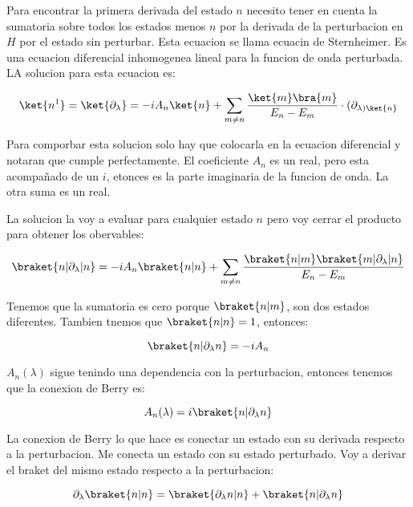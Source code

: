 \documentclass[11pt,fleqn]{book}
\begin{document}
Para encontrar la primera derivada del estado $n$ necesito tener en cuenta la sumatoria sobre todos los estados menos $n$ por la derivada de la perturbacion en $H$ por el estado sin perturbar. Esta ecuacion se llama ecuacin de Sternheimer. Es una ecuacion diferencial inhomogenea lineal para la funcion de onda perturbada. LA solucion para esta ecuacion es:

\begin{equation}
    \ket{n^{1}}=\ket{\partial_\lambda}=-iA_{n}\ket{n}+\sum_{m\neq n}\frac{\ket{m}\bra{m}}{E_{n}-E_{m}}\cdot(\partial_{\lambda)\ket{n}}
\end{equation}

Para comporbar esta solucion solo hay que colocarla en la ecuacion diferencial y notaran que cumple perfectamente. El coeficiente $A_{n}$ es un real, pero esta acompañado de un $i$, etonces es la parte imaginaria de la funcion de onda. La otra suma es un real. 

La solucion la voy a evaluar para cualquier estado $n$ pero voy cerrar el producto para obtener los obervables:

\begin{equation}
    \braket{n|\partial_{\lambda}|n}=-iA_{n}\braket{n|n}+\sum_{m\neq n}\frac{\braket{n|m}\braket{m|\partial_{\lambda}|n}}{E_{n}-E_{m}}
\end{equation}

Tenemos que la sumatoria es cero porque $\braket{n|m}$, son dos estados diferentes. Tambien tnemos que $\braket{n|n}=1$, entonces:

\begin{equation}
     \braket{n|\partial_{\lambda}n}=-iA_{n}
\end{equation}

$A_{n}(\lambda)$ sigue tenindo una dependencia con la perturbacion, entonces tenemos que la conexion de Berry es:

\begin{equation}
    A_{n}(\lambda)=i\braket{n|\partial_{\lambda}n}
\end{equation}

La conexion de Berry lo que hace es conectar un estado con su derivada respecto a la perturbacion. Me conecta un estado con su estado perturbado. Voy a derivar el braket del mismo estado respecto a la perturbacion:

\begin{equation}
    \partial_{\lambda}\braket{n|n}=\braket{\partial_{\lambda}n|n}+\braket{n|\partial_{\lambda}n}
\end{equation}
\end{document}
